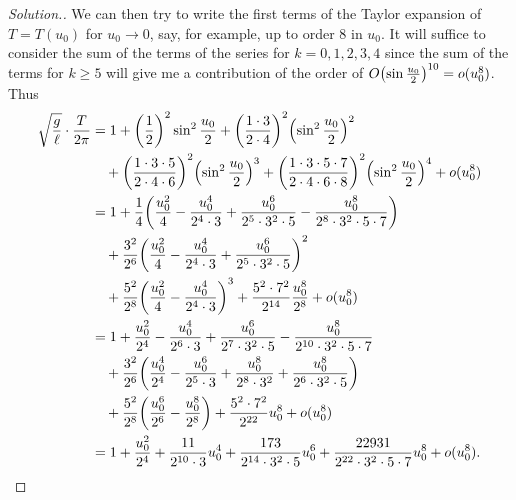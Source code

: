 \begin{proof}[Solution.]
We can then try to write the first terms of the Taylor expansion of $T = T(u_0)$
for $u_0\to 0$, say, for example, up to order 8 in $u_0$. It will suffice to
consider the sum of the terms of the series for $k=0,1,2,3,4$ since the sum of
the terms for $k\ge 5$ will give me a contribution of the order of
$O{\left( \sin \frac {u_0} 2 \right)}^{10} = o(u_0^8)$. Thus
 \begin{align*}
 \sqrt{\frac{g}{\ell}}\cdot \frac{T}{2\pi}
 &=
 1 + \enclose{\frac 1 2}^2 \sin^2 \frac{u_0} 2
 + \enclose{\frac{1\cdot 3}{2\cdot 4}}^2\enclose{\sin^2 \frac {u_0} 2}^2 \\
 &\quad + \enclose{\frac{1\cdot 3 \cdot 5}{2\cdot 4 \cdot 6}}^2
 \enclose{\sin^2 \frac {u_0} 2}^3 + \enclose{\frac{1\cdot 3\cdot 5 \cdot 7}{2\cdot 4\cdot 6\cdot 8}}^2
 \enclose{\sin^2 \frac {u_0} 2}^4 + o(u_0^8) \\
 &=
1 + \frac 1 4 \enclose{\frac{u_0^2}{4} - \frac{u_0^4}{2^4\cdot 3} +
\frac{u_0^6}{2^5\cdot 3^2\cdot 5}
- \frac{u_0^8}{2^8\cdot 3^2\cdot 5\cdot 7}} \\
&\quad + \frac{3^2}{2^6}\enclose{\frac{u_0^2}{4} - \frac{u_0^4}{2^4\cdot 3}
+ \frac{u_0^6}{2^5\cdot 3^2\cdot 5}}^2\\
&\quad + \frac{5^2}{2^8}\enclose{\frac{u_0^2}{4} - \frac{u_0^4}{2^4\cdot 3}}^3
+ \frac{5^2\cdot 7^2}{2^{14}}
\frac {u_0^8} {2^8} + o(u_0^8)\\
&=
1 + \frac{u_0^2}{2^4} - \frac{u_0^4}{2^6\cdot 3} + \frac{u_0^6}{2^7\cdot
3^2\cdot 5}
- \frac{u_0^8}{2^{10}\cdot 3^2\cdot 5\cdot 7} \\
&\quad + \frac{3^2}{2^6}\enclose{\frac{u_0^4}{2^4} - \frac{u_0^6}{2^5\cdot 3} +
\frac{u_0^8}{2^8\cdot 3^2} + \frac{u_0^8}{2^6\cdot 3^2\cdot 5}}\\
&\quad + \frac{5^2}{2^8}\enclose{\frac{u_0^6}{2^6} - \frac{u_0^8}{2^8}}
+ \frac{5^2\cdot 7^2}{2^{22}}
u_0^8 + o(u_0^8)\\
%
&= 1 + \frac{u_0^2}{2^4} + \frac{11}{2^{10}\cdot 3} u_0^4
 + \frac{173}{2^{14}\cdot 3^2\cdot 5} u_0^6
 + \frac{22931}{2^{22}\cdot 3^2\cdot 5\cdot 7} u_0^8
 + o(u_0^8).\\
\end{align*}
\end{proof}

